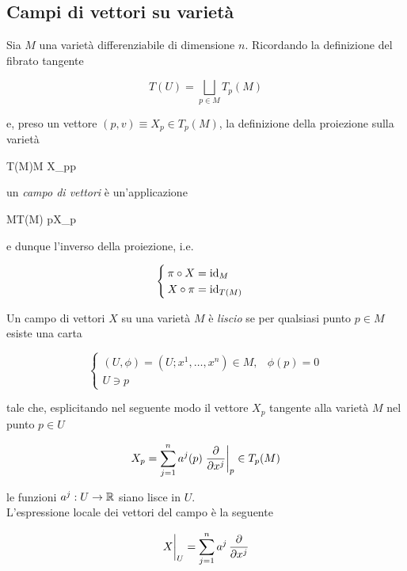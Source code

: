 \subsection{Campi di vettori su varietà}

Sia $ M $ una varietà differenziabile di dimensione $ n $. Ricordando la definizione del fibrato tangente

\begin{equation}
	T(U) = \bigsqcup_{p \in M} T_{p}(M)
\end{equation}

e, preso un vettore $ (p,v) \equiv X_{p} \in T_{p}(M) $, la definizione della proiezione sulla varietà

\map{\pi}
	{T(M)}{M}
	{X_{p}}{p}

un \textit{campo di vettori} è un'applicazione

	{M}{T(M)}
	{p}{X_{p}}

e dunque l'inverso della proiezione, i.e.

\begin{equation}
	\begin{cases}
		\pi \circ X = \operatorname{id}_{M} \\
		X \circ \pi = \operatorname{id}_{T(M)}
	\end{cases}
\end{equation}

Un campo di vettori $ X $ su una varietà $ M $ è \textit{liscio} se per qualsiasi punto $ p \in M $ esiste una carta

\begin{equation}
	\begin{cases}
		(U,\phi) = (U; x^{1},\dots,x^{n}) \in M, & \phi(p) = 0 \\
		U \ni p
	\end{cases}
\end{equation}

tale che, esplicitando nel seguente modo il vettore $ X_{p} $ tangente alla varietà $ M $ nel punto $ p \in U $

\begin{equation}
	X_{p} = \sum_{j=1}^{n} a^{j}(p) \eval{ \pdv{x^{j}} }_{p} \in T_{p}(M)
\end{equation}

le funzioni $ a^{j} : U \to \mathbb{R} $ siano lisce in $ U $.\\
L'espressione locale dei vettori del campo è la seguente

\begin{equation}
	\eval{X}_{U} = \sum_{j=1}^{n} a^{j} \, \pdv{x^{j}}
\end{equation}

